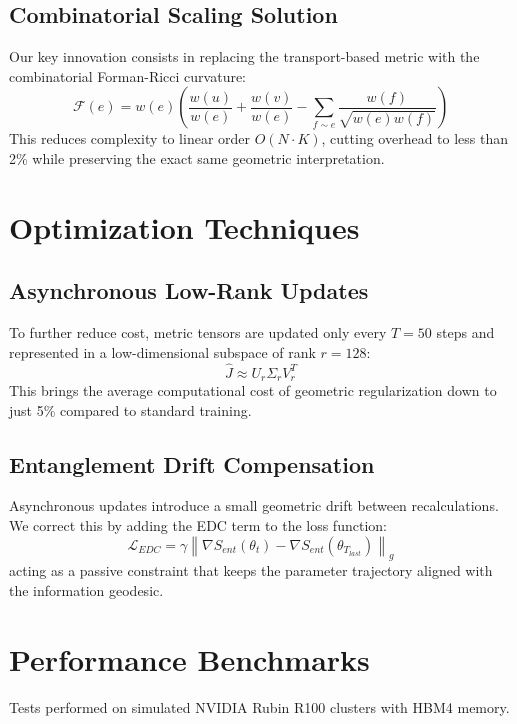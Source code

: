 \documentclass[11pt,twocolumn]{article}
\begin{document}
\subsection{Combinatorial Scaling Solution}
Our key innovation consists in replacing the transport-based metric with the combinatorial Forman-Ricci curvature:
\begin{equation}
\mathcal{F}(e) = w(e) \left( \frac{w(u)}{w(e)} + \frac{w(v)}{w(e)} - \sum_{f \sim e} \frac{w(f)}{\sqrt{w(e)w(f)}} \right)
\end{equation}
This reduces complexity to linear order $O(N \cdot K)$, cutting overhead to less than 2\% while preserving the exact same geometric interpretation.

\section{Optimization Techniques}

\subsection{Asynchronous Low-Rank Updates}
To further reduce cost, metric tensors are updated only every $T=50$ steps and represented in a low-dimensional subspace of rank $r=128$:
\begin{equation}
\hat{J} \approx U_r \Sigma_r V_r^T
\end{equation}
This brings the average computational cost of geometric regularization down to just 5\% compared to standard training.

\subsection{Entanglement Drift Compensation}
Asynchronous updates introduce a small geometric drift between recalculations. We correct this by adding the EDC term to the loss function:
\begin{equation}
\mathcal{L}_{EDC} = \gamma \left\| \nabla S_{ent}(\theta_t) - \nabla S_{ent}(\theta_{T_{last}}) \right\|_g
\end{equation}
acting as a passive constraint that keeps the parameter trajectory aligned with the information geodesic.

\section{Performance Benchmarks}
Tests performed on simulated NVIDIA Rubin R100 clusters with HBM4 memory.
\end{document}
